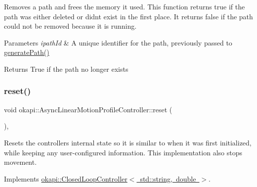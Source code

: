 Removes a path and frees the memory it used. This function returns true if the path was either deleted or didn\textquotesingle{}t exist in the first place. It returns false if the path could not be removed because it is running.


\begin{DoxyParams}{Parameters}
{\em ipath\+Id} & A unique identifier for the path, previously passed to \mbox{\hyperlink{classokapi_1_1AsyncLinearMotionProfileController_aef2acba51417d929695ca38e309b0f6c}{generate\+Path()}} \\
\hline
\end{DoxyParams}
\begin{DoxyReturn}{Returns}
True if the path no longer exists 
\end{DoxyReturn}
\mbox{\label{classokapi_1_1AsyncLinearMotionProfileController_a925381153aeda65c448489a8f2c3803c}} 
\subsubsection{\texorpdfstring{reset()}{reset()}}
{\footnotesize\ttfamily void okapi\+::\+Async\+Linear\+Motion\+Profile\+Controller\+::reset (\begin{DoxyParamCaption}{ }\end{DoxyParamCaption})\hspace{0.3cm}{\ttfamily [override]}, {\ttfamily [virtual]}}

Resets the controller\textquotesingle{}s internal state so it is similar to when it was first initialized, while keeping any user-\/configured information. This implementation also stops movement. 

Implements \mbox{\hyperlink{classokapi_1_1ClosedLoopController_a7dd6ce28b3e38bdf987514a1b6c83c8c}{okapi\+::\+Closed\+Loop\+Controller$<$ std\+::string, double $>$}}.

\mbox{\label{classokapi_1_1AsyncLinearMotionProfileController_a18e3ba77f08cb5dd93a9cba23d4c2a1e}} 
